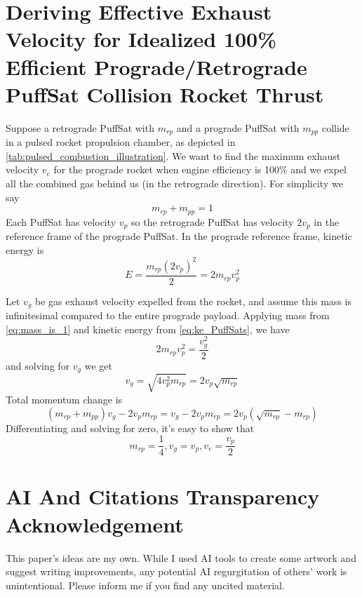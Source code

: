 \documentclass{article}
\begin{document}
\section{Deriving Effective Exhaust Velocity for Idealized 100\% Efficient Prograde/Retrograde PuffSat Collision Rocket Thrust}\label{sec:dv_effective}
Suppose a retrograde PuffSat with $m_{rp}$ and a prograde PuffSat with $m_{pp}$ collide in a pulsed rocket propulsion chamber, as depicted in \autoref{tab:pulsed_combustion_illustration}.  We want to find the maximum exhaust velocity $v_e$ for the prograde rocket  when engine efficiency is 100\% and we expel all the combined gas behind us (in the retrograde direction).   For simplicity we say 
\begin{equation}
m_{rp} + m_{pp} = 1\label{eq:mass_is_1}
\end{equation} 
Each PuffSat has velocity $v_p$ so the retrograde PuffSat has velocity $2v_p$ in the reference frame of the prograde PuffSat.   In the prograde reference frame, kinetic energy is
\begin{equation}
E = \frac{m_{rp} (2v_p)^2}{2} = 2m_{rp}v_p^2\label{eq:ke_PuffSats}
\end{equation}

Let $v_g$ be gas exhaust velocity expelled from the rocket, and assume this mass is infinitesimal compared to the entire prograde payload.  Applying mass from \autoref{eq:mass_is_1}
 and kinetic energy from \autoref{eq:ke_PuffSats}, we have 
 \begin{equation}
 2m_{rp}v_p^2= \frac{v_g^2}{2}
 \end{equation}
 and solving for $v_g$ we get 
 \begin{equation}
 v_g = \sqrt{4v_p^2m_{rp}} = 2v_p\sqrt{m_{rp}} \label{eq:vg_result}
 \end{equation}
 Total momentum change is 
 \[(m_{rp} + m_{pp})v_g - 2v_pm_{rp} = v_g-2v_pm_{rp} = 2v_p(\sqrt{m_{rp}} - m_{rp}) \]
Differentiating and solving for zero, it's easy to show that 
 \begin{equation}
 m_{rp} = \frac{1}{4}, \label{eq:max_m_rp}
 v_g = v_p,
 v_e= \frac{v_p}{2}
 \end{equation}

 \section{AI And Citations Transparency Acknowledgement}
 This paper's ideas are my own. While I used AI tools to create some artwork and suggest writing improvements, any potential AI regurgitation of others' work is unintentional. Please inform me if you find any uncited material.
\end{document}
